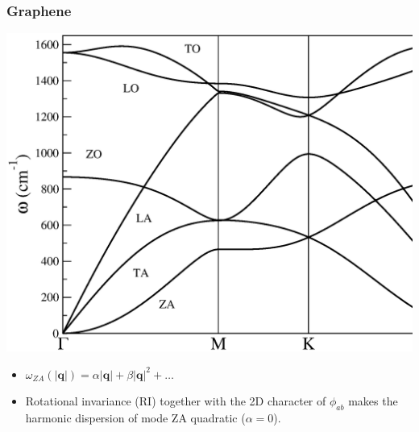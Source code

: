 \documentclass{beamer}
\begin{document}
\begin{frame}

\frametitle{Graphene}
 \begin{center}
 \includegraphics[width=0.7\linewidth]{Pictures/Graphene/phonon-harmonic.eps}
\end{center}
\begin{itemize}
 \item $\omega_{ZA}(|\boldsymbol{q}|)=\alpha|\boldsymbol{q}|+\beta|\boldsymbol{q}|^{2}+\dots$
 \item Rotational invariance (RI) together with the 2D character of $\phi_{ab}$ makes the harmonic dispersion of mode ZA quadratic ($\alpha=0$).
\end{itemize}

\end{frame}

\end{document}
